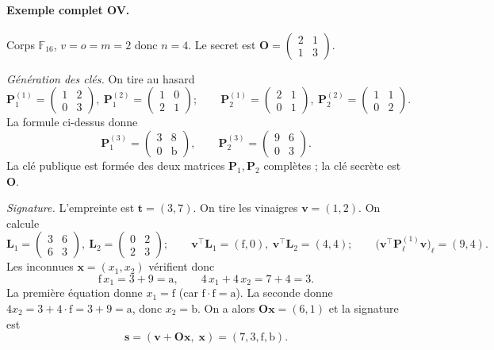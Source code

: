 \paragraph{Exemple complet OV.} Corps $\mathbb{F}_{16}$, $v=o=m=2$ donc $n=4$. Le secret est $\mathbf{O}=\begin{pmatrix}2&1\\1&3\end{pmatrix}$.

\emph{Génération des clés.} On tire au hasard
\[\mathbf{P}^{(1)}_1=\begin{pmatrix}1&2\\0&3\end{pmatrix},\ \mathbf{P}^{(2)}_1=\begin{pmatrix}1&0\\2&1\end{pmatrix};\qquad \mathbf{P}^{(1)}_2=\begin{pmatrix}2&1\\0&1\end{pmatrix},\ \mathbf{P}^{(2)}_2=\begin{pmatrix}1&1\\0&2\end{pmatrix}.\]
La formule ci-dessus donne
\[\mathbf{P}^{(3)}_1=\begin{pmatrix}3&8\\0&\mathrm{b}\end{pmatrix},\qquad \mathbf{P}^{(3)}_2=\begin{pmatrix}9&6\\0&3\end{pmatrix}.\]
La clé publique est formée des deux matrices $\mathbf{P}_1,\mathbf{P}_2$ complètes ; la clé secrète est $\mathbf{O}$.

\emph{Signature.} L'empreinte est $\mathbf{t}=(3,7)$. On tire les vinaigres $\mathbf{v}=(1,2)$. On calcule
\[\mathbf{L}_1=\begin{pmatrix}3&6\\6&3\end{pmatrix},\ \mathbf{L}_2=\begin{pmatrix}0&2\\2&3\end{pmatrix};\qquad \mathbf{v}^{\top}\mathbf{L}_1=(\mathrm{f},0),\ \mathbf{v}^{\top}\mathbf{L}_2=(4,4);\qquad \bigl(\mathbf{v}^{\top}\mathbf{P}^{(1)}_\ell\mathbf{v}\bigr)_\ell=(9,4).\]
Les inconnues $\mathbf{x}=(x_1,x_2)$ vérifient donc
\[\mathrm{f}\,x_1=3+9=\mathrm{a},\qquad 4\,x_1+4\,x_2=7+4=3.\]
La première équation donne $x_1=\mathrm{f}$ (car $\mathrm{f}\cdot\mathrm{f}=\mathrm{a}$). La seconde donne $4x_2=3+4\cdot\mathrm{f}=3+9=\mathrm{a}$, donc $x_2=\mathrm{b}$. On a alors $\mathbf{O}\mathbf{x}=(6,1)$ et la signature est
\[\mathbf{s}=(\mathbf{v}+\mathbf{O}\mathbf{x},\;\mathbf{x})=(7,3,\mathrm{f},\mathrm{b}).\]


